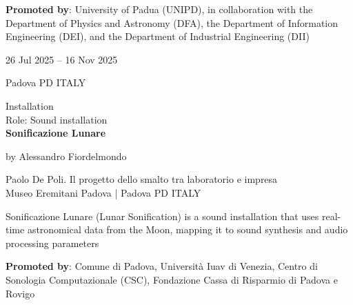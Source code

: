 \documentclass[7pt,a4paper]{article}
\begin{document}
\begin{mdframed}
\begin{minipage}[t]{0.68\textwidth}
\vspace{0.1cm}
\par \textbf{Promoted by}: University of Padua (UNIPD), in collaboration with the Department of Physics and Astronomy (DFA), the Department of Information Engineering (DEI), and the Department of Industrial Engineering (DII)
\end{minipage}
\vspace{0.25cm}
\end{mdframed}


\begin{mdframed}[
    backgroundcolor=entrygray,
    linecolor=entrygray,
    linewidth=0pt,
    innerleftmargin=6pt,
    innerrightmargin=6pt,
    innertopmargin=6pt,
    innerbottommargin=6pt,
    skipabove=0pt,
    skipbelow=0pt
]

\begin{minipage}[t]{0.28\textwidth}

26 Jul 2025 – 16 Nov 2025

\scriptsize Padova PD ITALY


\end{minipage}
\begin{minipage}[t]{0.68\textwidth}
\small Installation
\\\scriptsize Role: Sound installation
\\ \normalsize \textbf{Sonificazione Lunare}
\par\scriptsize by Alessandro Fiordelmondo

\vspace{0.25cm}



\small Paolo De Poli. Il progetto dello smalto tra laboratorio e impresa\\Museo Eremitani Padova | \scriptsize Padova PD ITALY

\vspace{0.1cm}
\scriptsize

Sonificazione Lunare (Lunar Sonification) is a sound installation that uses real-time astronomical data from the Moon, mapping it to sound synthesis and audio processing parameters

\vspace{0.1cm}
\par \textbf{Promoted by}: Comune di Padova, Università Iuav di Venezia, Centro di Sonologia Computazionale (CSC), Fondazione Cassa di Risparmio di Padova e Rovigo
\end{minipage}
\vspace{0.25cm}
\end{mdframed}
\end{document}
